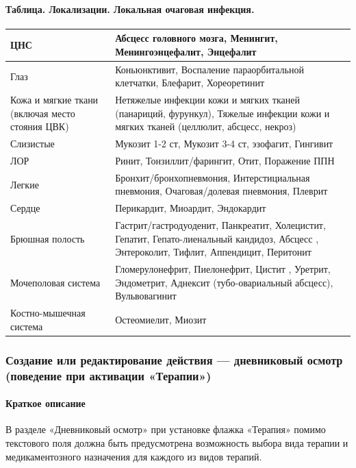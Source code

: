 \documentclass[a4paper,8pt]{report} %
\begin{document}
{    \paragraph*{Таблица. Локализации. Локальная очаговая инфекция.}
        \begin{tabularx}{\textwidth}{ |X|X|X| }
            \hline
            ЦНС  & Абсцесс головного мозга, Менингит, Менингоэнцефалит, Энцефалит                           \\ \hline
            Глаз & Коньюнктивит, Воспаление параорбитальной клетчатки, Блефарит, Хореоретинит               \\ \hline
            Кожа и мягкие ткани (включая место стояния ЦВК) & Нетяжелые инфекции кожи и мягких тканей
                (панариций, фурункул), Тяжелые инфекции кожи и мягких тканей (целлюлит, абсцесс, некроз)    \\ \hline
            Слизистые & Мукозит 1-2 ст, Мукозит 3-4 ст, эзофагит, Гингивит                                  \\ \hline
            ЛОР & Ринит, Тонзиллит/фарингит, Отит, Поражение ППН                                            \\ \hline
            Легкие & Бронхит/бронхопневмония, Интерстициальная пневмония, Очаговая/долевая пневмония,
                Плеврит                                                                                     \\ \hline
            Сердце & Перикардит, Миоардит, Эндокардит \\
            Брюшная полость & Гастрит/гастродуоденит, Панкреатит, Холецистит, Гепатит,
                Гепато-лиенальный кандидоз, Абсцесс , Энтероколит, Тифлит, Аппендицит, Перитонит            \\ \hline
            Мочеполовая система & Гломерулонефрит, Пиелонефрит, Цистит , Уретрит, Эндометрит, Аднексит
                (тубо-овариальный абсцесс), Вульвовагинит                                                   \\ \hline
            Костно-мышечная система & Остеомиелит, Миозит                                                   \\
            \hline
         \end{tabularx}
 \subsubsection{Создание или редактирование действия — дневниковый осмотр (поведение при активации «Терапии»)}
    \paragraph*{Краткое описание}
        В разделе «Дневниковый осмотр» при установке флажка «Терапия» помимо текстового
        поля должна быть предусмотрена возможность выбора вида терапии и медикаментозного
        назначения для каждого из видов терапий.

}
\end{document}

